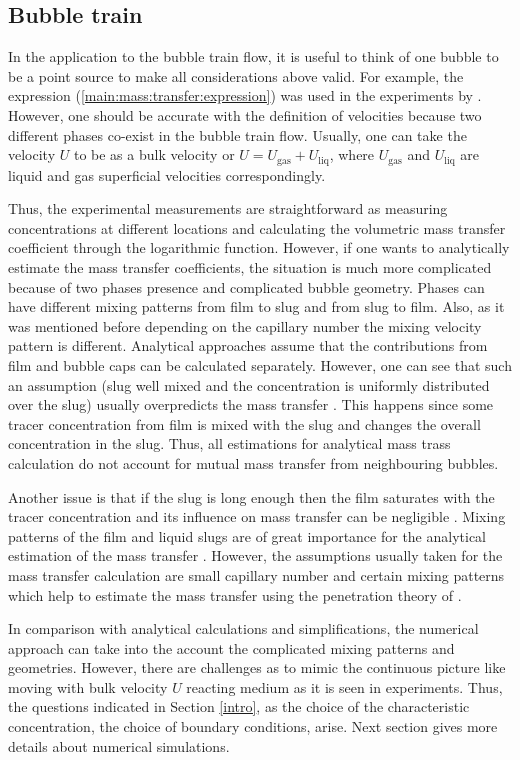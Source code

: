 \documentclass{article}
\newcommand{\uliq}{U_{\mathrm{liq}}}
\newcommand{\ugas}{U_{\mathrm{gas}}}
\begin{document}
\subsection{Bubble train}
In the application to the bubble train flow, it is useful to think of one bubble to be a point
source to make all considerations above valid. For example, the expression
(\ref{main:mass:transfer:expression}) was used in the experiments by
\citet{bercic-mass}. However, one should be accurate with the definition of velocities because two
different phases co-exist in the bubble train flow. Usually, one can take the velocity $U$ to be as
a bulk velocity or $U=\ugas+\uliq$, where $\ugas$ and $\uliq$ are liquid and gas
superficial velocities correspondingly. 

Thus, the experimental measurements are straightforward as measuring concentrations at
different
locations and calculating the volumetric mass transfer coefficient through the logarithmic
function. However, if one wants to analytically estimate the mass transfer coefficients, the
situation is much more complicated because of two phases presence and complicated bubble
geometry. Phases can have different mixing patterns
from film to slug and from slug to film. Also, as it was mentioned before depending on the capillary
number the mixing velocity pattern is different. Analytical approaches
\cite{irandoust,vanbaten-circular} assume that the
contributions from film and bubble caps can be calculated separately. However, one can see that
such 
an assumption (slug well mixed and the concentration is uniformly distributed over
the slug) usually overpredicts the mass transfer \cite{irandoust}. This happens since some tracer
concentration from film is mixed with the slug and changes the overall concentration in the slug.
Thus, all estimations for analytical mass trass calculation  do not account for mutual mass
transfer from
neighbouring bubbles.

Another issue is that if the slug is long enough then the film saturates with the tracer
concentration and its influence on mass transfer can be negligible \cite{vanbaten-circular}.
Mixing patterns of the film and liquid slugs are of great importance for the analytical
estimation of the mass transfer \cite{yue-mass}. However, the assumptions usually taken for the
mass transfer calculation are small capillary number and certain mixing patterns which help to
estimate the mass transfer using the penetration theory of \citet{higbie}.

In comparison with analytical calculations and simplifications, the numerical approach can take into
the account the complicated mixing patterns and geometries. However, there are challenges as to
mimic the continuous picture like moving with bulk velocity $U$ reacting medium as it is seen in
experiments. Thus, the questions indicated in Section \ref{intro}, as the choice of the
characteristic concentration, the choice of boundary conditions, arise. Next
section gives more details about numerical simulations.
 
\end{document}
